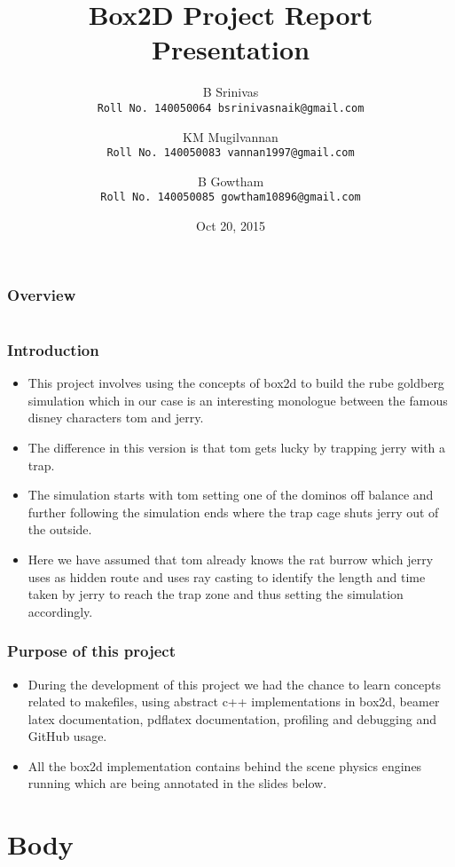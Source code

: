 \documentclass[]{beamer}%
\title[About presentation] %
{Box2D Project Report Presentation}
\author{
	B Srinivas \\
   \texttt{Roll No. 140050064
    bsrinivasnaik@gmail.com}\\
\and
	KM Mugilvannan \\
    \texttt{Roll No. 140050083 
    vannan1997@gmail.com}\\
\and
	B Gowtham \\
    \texttt{Roll No. 140050085 
    gowtham10896@gmail.com}\\
}
\date{Oct 20, 2015}
\begin{document}
\begin{frame}
\titlepage
\end{frame}

\frame{\titlepage}

\begin{frame}
	\frametitle{Overview} 
	\begin{columns}
		\tableofcontents[] 
	\end{columns}
\end{frame}

\begin{frame}
\frametitle{Introduction}
	\begin{itemize}
		\item<1->This project involves using the concepts of box2d to build the rube goldberg simulation which in our case is an interesting monologue between the famous disney characters tom and jerry. 
		\item<2->The difference in this version is that tom gets lucky by trapping jerry with a trap. 
		\item<3->The simulation starts with tom setting one of the dominos off balance and further following the simulation ends where the trap cage shuts jerry out of the outside. 
		\item<4->Here we have assumed that tom already knows the rat burrow which jerry uses as hidden route and uses ray casting to identify the length and time taken by jerry to reach the trap zone and thus setting the simulation accordingly.
	\end{itemize} 
\end{frame}

\begin{frame}
\frametitle{Purpose of this project}
	\begin{itemize}
		\item<1->During the development of this project we had the chance to learn concepts related to makefiles, using abstract c++ implementations in box2d, beamer latex documentation, pdflatex documentation, profiling and debugging and GitHub usage. 
		\item<2->All the box2d implementation contains behind the scene physics engines running which are being annotated in the slides below.
	\end{itemize}
\end{frame}

\section{Body}
\end{document}
